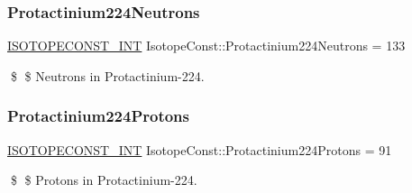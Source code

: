 \subsubsection{\texorpdfstring{Protactinium224\+Neutrons}{Protactinium224Neutrons}}
{\footnotesize\ttfamily \mbox{\hyperlink{group___isotope_const-_macros_ga5f18360b3e99483a35c32d789e62621c}{I\+S\+O\+T\+O\+P\+E\+C\+O\+N\+S\+T\+\_\+\+I\+NT}} Isotope\+Const\+::\+Protactinium224\+Neutrons = 133}

\$ \$ Neutrons in Protactinium-\/224. \mbox{\label{group___isotope_const-_protactinium-_pa224_ga147414c3d867d5c74a67cee34d88eaf6}} 
\subsubsection{\texorpdfstring{Protactinium224\+Protons}{Protactinium224Protons}}
{\footnotesize\ttfamily \mbox{\hyperlink{group___isotope_const-_macros_ga5f18360b3e99483a35c32d789e62621c}{I\+S\+O\+T\+O\+P\+E\+C\+O\+N\+S\+T\+\_\+\+I\+NT}} Isotope\+Const\+::\+Protactinium224\+Protons = 91}

\$ \$ Protons in Protactinium-\/224. 